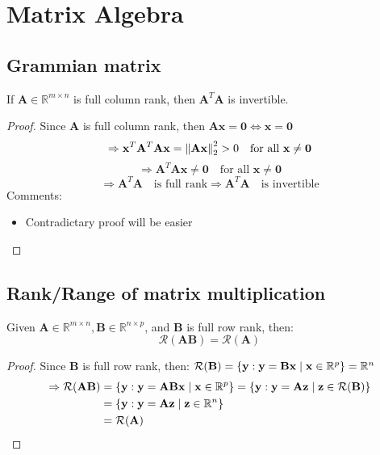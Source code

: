 \documentclass[11pt,a4paper]{article}
\begin{document}
\section{Matrix Algebra}%
\label{sec:basic_algebra}

\subsection{Grammian matrix}%
\label{sub:grammian_matrix}

\begin{lemma}
    \label{lemma:gramia-matrix}
    If $\mathbf{A} \in \mathbb{R}^{m\times n}$ is full column rank, then $\mathbf{A}^T\mathbf{A}$ is invertible.
\end{lemma}
\begin{proof}
    Since $\mathbf{A}$ is full column rank, then $\mathbf{A}\mathbf{x}= \mathbf{0} \Leftrightarrow \mathbf{x} =\mathbf{0}$
   \[
   \Rightarrow \mathbf{x}^T \mathbf{A}^T\mathbf{A}\mathbf{x} = \left\lVert\mathbf{A}\mathbf{x}\right\rVert_2^2 > 0 \quad \text{for all }\mathbf{x} \neq \mathbf{0}
   \]   
   \[
   \Rightarrow \mathbf{A}^T\mathbf{A} \mathbf{x} \neq \mathbf{0} \quad \text{for all }\mathbf{x} \neq \mathbf{0}
   \] 
   \[
   \Rightarrow \mathbf{A}^T\mathbf{A} \quad \text{is full rank} \Rightarrow \mathbf{A}^T\mathbf{A} \quad \text{is invertible}
   \] 
   Comments:
   \begin{itemize}[noitemsep]
       \item Contradictary proof will be easier
   \end{itemize}
\end{proof}

\subsection{Rank/Range of matrix multiplication}%
\label{sub:rank_range_of_matrix_multiplication}


\begin{lemma}
    \label{lemma:rank/range of matrix multiplication}
    Given $\mathbf{A}\in \mathbb{R}^{m\times n}, \mathbf{B}\in \mathbb{R}^{n\times p}$, and $\mathbf{B}$ is full row rank, then:
    \[
        \mathcal{R}(\mathbf{A}\mathbf{B}) = \mathcal{R}(\mathbf{A})
    \] 
\end{lemma}
\begin{proof}
    Since $\mathbf{B}$ is full row rank, then: $\mathcal{R}(\mathbf{B})=\left\{\mathbf{y}: \mathbf{y}=\mathbf{B}\mathbf{x} \mid \mathbf{x}\in \mathbb{R}^{p}\right\} = \mathbb{R}^{n}$
    \begin{align*}
        \Rightarrow \mathcal{R}(\mathbf{A}\mathbf{B}) &= \left\{\mathbf{y}: \mathbf{y}=\mathbf{A}\mathbf{B}\mathbf{x} \mid \mathbf{x}\in \mathbb{R}^{p}\right\} = \left\{\mathbf{y}: \mathbf{y}= \mathbf{A}\mathbf{z} \mid \mathbf{z}\in \mathcal{R}(\mathbf{B})\right\} \\
&= \left\{\mathbf{y}: \mathbf{y}=\mathbf{A}\mathbf{z} \mid \mathbf{z}\in \mathbb{R}^{n}\right\}\\
&= \mathcal{R}(\mathbf{A})
    \end{align*}
\end{proof}
\end{document}
